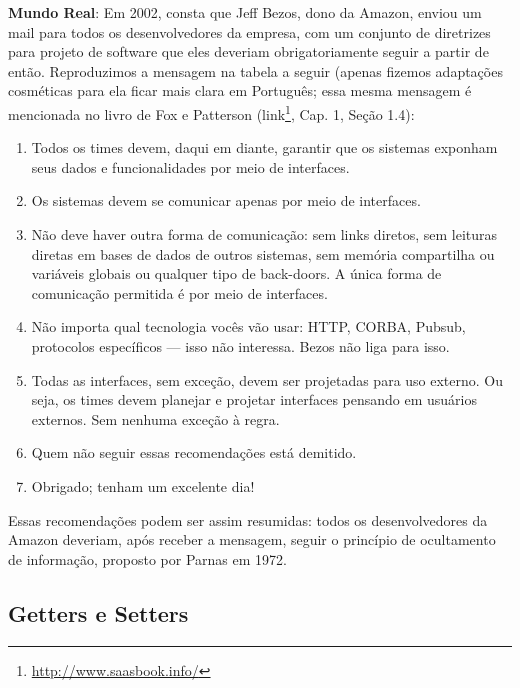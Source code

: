\documentclass[
  11pt,
  twoside]{book}
\DeclareRobustCommand{\href}[2]{#2\footnote{\url{#1}}}
\newenvironment{esmbox}{\centering \vspace{1.5ex} \begin{tcolorbox}[breakable, colback=backcolor, width=4.9in]}{\end{tcolorbox} \vspace{1.5ex}}
\begin{document}
\begin{esmbox} 

\textbf{Mundo Real}: Em 2002, consta que Jeff Bezos, dono da Amazon,
enviou um mail para todos os desenvolvedores da empresa, com um conjunto
de diretrizes para projeto de software que eles deveriam
obrigatoriamente seguir a partir de então. Reproduzimos a mensagem na
tabela a seguir (apenas fizemos adaptações cosméticas para ela ficar
mais clara em Português; essa mesma mensagem é mencionada no livro de
Fox e Patterson (\href{http://www.saasbook.info/}{link}, Cap. 1, Seção
1.4):

\begin{enumerate}
\def\labelenumi{\arabic{enumi}.}
\item
  Todos os times devem, daqui em diante, garantir que os sistemas
  exponham seus dados e funcionalidades por meio de interfaces.
\item
  Os sistemas devem se comunicar apenas por meio de interfaces.
\item
  Não deve haver outra forma de comunicação: sem links diretos, sem
  leituras diretas em bases de dados de outros sistemas, sem memória
  compartilha ou variáveis globais ou qualquer tipo de back-doors. A
  única forma de comunicação permitida é por meio de interfaces.
\item
  Não importa qual tecnologia vocês vão usar: HTTP, CORBA, Pubsub,
  protocolos específicos --- isso não interessa. Bezos não liga para
  isso.
\item
  Todas as interfaces, sem exceção, devem ser projetadas para uso
  externo. Ou seja, os times devem planejar e projetar interfaces
  pensando em usuários externos. Sem nenhuma exceção à regra.
\item
  Quem não seguir essas recomendações está demitido.
\item
  Obrigado; tenham um excelente dia!
\end{enumerate}

Essas recomendações podem ser assim resumidas: todos os desenvolvedores da Amazon deveriam, após receber a mensagem, seguir o princípio de ocultamento de informação, proposto por Parnas em 1972.

\end{esmbox} 

\hypertarget{getters-e-setters}{%
\subsection{Getters e Setters}\label{getters-e-setters}}
\end{document}
